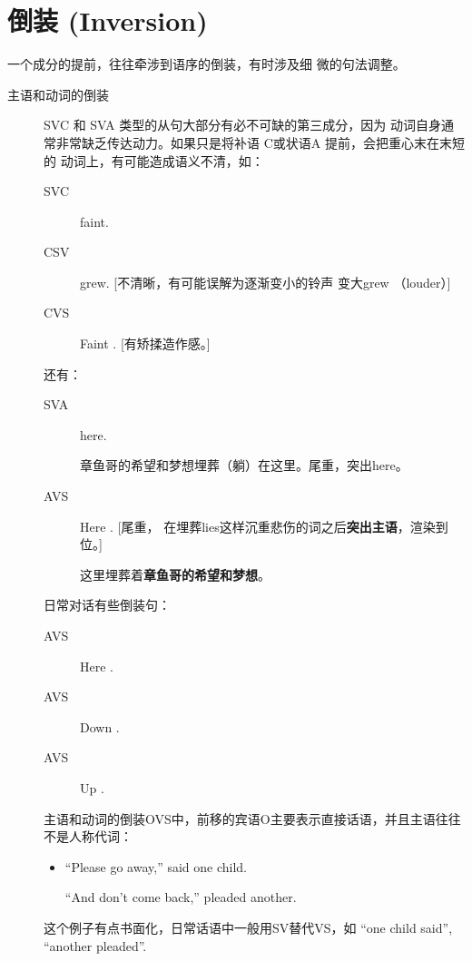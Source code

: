 \section{倒装 (Inversion)}
\label{subsec:inversion}

 一个成分的提前，往往牵涉到语序的倒装，有时涉及细
微的句法调整。
\begin{description}
\item[主语和动词的倒装] SVC 和 SVA 类型的从句大部分有必不可缺的第三成分，因为
  动词自身通常非常缺乏传达动力。如果只是将补语 C或状语A 提前，会把重心末在末短的
  动词上，有可能造成语义不清，如：
  \begin{description}
  \item[SVC]   faint.
  \item[CSV]   grew. [不清晰，有可能误解为逐渐变小的铃声
    变大grew （louder）]
  \item[CVS] Faint  . [有矫揉造作感。]
  \end{description}
  还有：
  \begin{description}
  \item[SVA]   here.

    章鱼哥的希望和梦想埋葬（躺）在这里。尾重，突出here。

  \item[AVS] Here  . [尾重，
    在埋葬lies这样沉重悲伤的词之后\textbf{突出主语}，渲染到位。]

    这里埋葬着\textbf{章鱼哥的希望和梦想}。
  \end{description}
  日常对话有些倒装句：
  \begin{description}
  \item[AVS] Here  .

  \item[AVS] Down  .
  \item[AVS] Up  .
  \end{description}

  主语和动词的倒装OVS中，前移的宾语O主要表示直接话语，并且主语往往不是人称代词：
  \begin{itemize}
  \item ``Please go away,'' said one child.

    ``And don't come back,'' pleaded another.
  \end{itemize}
  这个例子有点书面化，日常话语中一般用SV替代VS，如 ``one child said'',
  ``another pleaded''.


\end{description}
